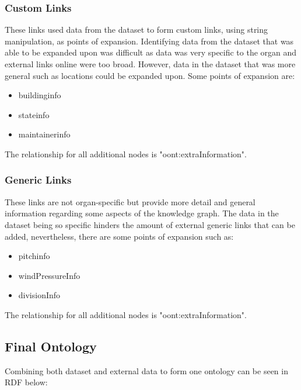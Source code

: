 \subsubsection{Custom Links}
\hspace*{0.5cm} These links used data from the dataset to form custom links, using string manipulation, as points of expansion. Identifying data from the dataset that was able to be expanded upon was difficult as data was very specific to the organ and external links online were too broad. However, data in the dataset that was more general such as locations could be expanded upon. Some points of expansion are:

\begin{itemize}
    \itemsep0em 
    \item buildinginfo
    \item stateinfo
    \item maintainerinfo
\end{itemize}

The relationship for all additional nodes is "oont:extraInformation".

\subsubsection{Generic Links}
\hspace*{0.5cm} These links are not organ-specific but provide more detail and general information regarding some aspects of the knowledge graph. The data in the dataset being so specific hinders the amount of external generic links that can be added, nevertheless, there are some points of expansion such as:

\begin{itemize}
    \itemsep0em 
    \item pitchinfo
    \item windPressureInfo
    \item divisionInfo
\end{itemize}

The relationship for all additional nodes is "oont:extraInformation".

\subsection{Final Ontology}
\hspace*{0.5cm} Combining both dataset and external data to form one ontology can be seen in RDF below:

